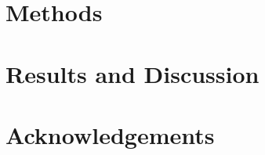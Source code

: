 \documentclass{article}
\begin{document}
\section{Methods}

\section{Results and Discussion}

\section*{Acknowledgements}


%
%






  
\end{document}
